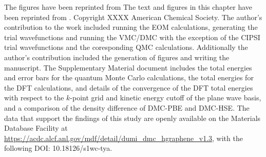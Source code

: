 The figures have been reprinted from \cite{Dumi2021}
The text and figures in this chapter have been reprinted from \cite{Dumi2021}.
Copyright XXXX American Chemical Society. %
The author's contribution to the work included running the EOM calculations, generating the trial wavefunctions and running the VMC/DMC with the exception of the CIPSI trial wavefunctions and the coresponding QMC calculations. Additionally the author's contribution included the generation of figures and writing the manuscript.
The Supplementary Material document includes the total energies and error bars for the quantum Monte Carlo calculations, the total energies for the DFT calculations, and details of the convergence of the DFT total energies with respect to the $k$-point grid and kinetic energy cutoff of the plane wave basis, and a comparison of the density difference of DMC-PBE and DMC-HSE.
 The data that support the findings of this study are openly available on the Materials Database Facility at \url{https://acdc.alcf.anl.gov/mdf/detail/dumi_dmc_hgraphene_v1.3}, with the following DOI: 10.18126/s1wc-tya.
